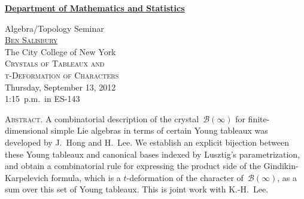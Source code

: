 \documentclass[12pt]{article}
\begin{document}
\noindent\hspace{-28pt}\raisebox{-19pt}{\XeTeXpicfile UAlogo.jpg scaled 340}%
\hfill\textsf{\textbf{\footnotesize\href{http://www.albany.edu/math/}{Department of Mathematics and Statistics}}}\bigskip\bigskip

\begin{center}\Large
  \textsf{\huge Algebra/Topology Seminar}\\[2.5\bigskipamount]
  \textsc{\LARGE \href{http://www.sci.ccny.cuny.edu/~salisbury/}{Ben Salisbury}}\\
  The City College of New York\\[1.5\bigskipamount]
  \textsc{\LARGE Crystals of Tableaux and\\ t-Deformation of Characters}\\[2\bigskipamount]
  Thursday, September 13, 2012\\1:15~p.m.\ in ES-143\\[3\bigskipamount]
\end{center}

\noindent\large\textsc{Abstract.}
A combinatorial description of the crystal~$\mathcal{B}(\infty)$ for finite-dimensional simple Lie algebras in terms of certain Young tableaux was developed by J.~Hong and H.~Lee.
We establish an explicit bijection between these Young tableaux and canonical bases indexed by Lusztig's parametrization, and obtain a combinatorial rule for expressing the product side of the Gindikin-Karpelevich formula, which is a $t$-deformation of the character of~$\mathcal{B}(\infty)$, as a sum over this set of Young tableaux.
This is joint work with K.-H.~Lee.
\end{document}
